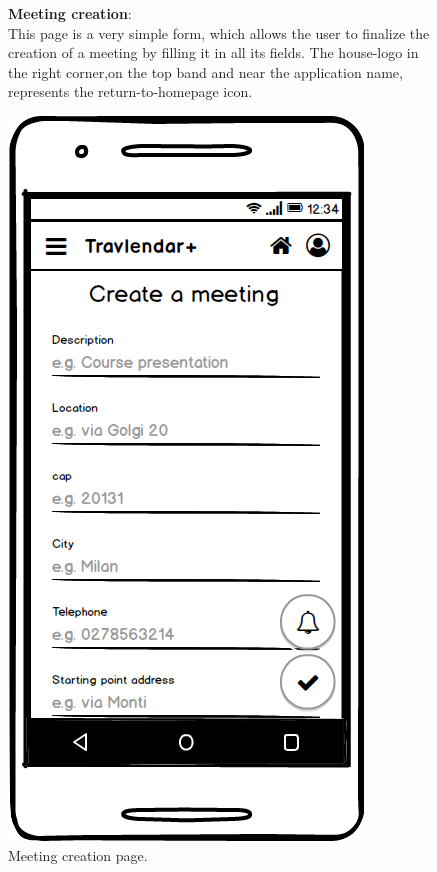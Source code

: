 	\begin{figure}
			\begin{flushleft}
			\textbf{Meeting creation}:\\
			This page is a very simple form, which allows the user to finalize the creation of a meeting by filling it in all its fields. 
			The house-logo in the  right corner,on the top band and near the application name, represents the return-to-homepage icon. 
		\end{flushleft}
		\centering
		\includegraphics[width=0.6\linewidth]{mockups/CreateMeeting}
		\caption{Meeting creation page.}
		\label{fig:createmeeting}
	\end{figure}

